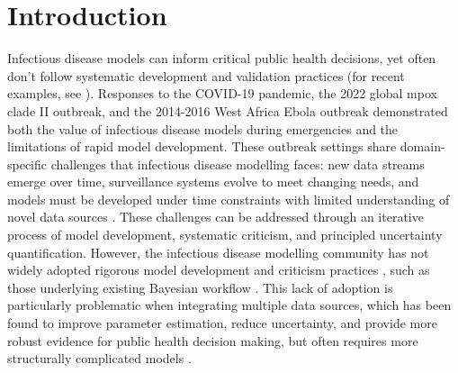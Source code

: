 \documentclass{article}
\begin{document}
\tableofcontents
\newpage

\section{Introduction}

Infectious disease models can inform critical public health decisions, yet often don't follow systematic development and validation practices (for recent examples, see \citet{Ward2024-sp, Fyles2024-qz, Abbott2021-delta, Abbott2022-prevalence}).
Responses to the COVID-19 pandemic, the 2022 global mpox clade II outbreak, and the 2014-2016 West Africa Ebola outbreak \citep[e.g.][]{knock2021key, ro2025estimating, Abbott2021-delta, Abbott2022-prevalence, Ward2024-sp, birrell2025real} demonstrated both the value of infectious disease models during emergencies and the limitations of rapid model development.
These outbreak settings share domain-specific challenges that infectious disease modelling faces: new data streams emerge over time, surveillance systems evolve to meet changing needs, and models must be developed under time constraints with limited understanding of novel data sources \citep{mccaw2023role}.
These challenges can be addressed through an iterative process of model development, systematic criticism, and principled uncertainty quantification. However, the infectious disease modelling community has not widely adopted rigorous model development and criticism practices \citep{box1979robustness}, such as those underlying existing  Bayesian workflow \citep{green2003highly,gelman2020bayesian, nicholson2022interoperability}.
This lack of adoption is particularly problematic when integrating multiple data sources, which has been found to improve parameter estimation, reduce uncertainty, and provide more robust evidence for public health decision making, but often requires more structurally complicated models \citep{deangelis2018analysing, sherratt2021exploring}.
\end{document}
